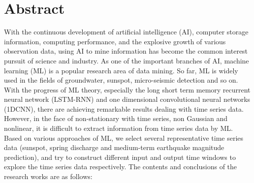 \intobmk\chapter*{Abstract}
With the continuous development of artificial intelligence (AI), computer storage information, computing performance, and the explosive growth of various observation data, using AI to mine information has become the common interest pursuit of science and industry. As one of the important branches of AI, machine learning (ML) is a popular research area of data mining. So far, ML is widely used in the fields of groundwater, sunspot, micro-seismic detection and so on. With the progress of ML theory, especially the long short term memory recurrent neural network (LSTM-RNN) and one dimensional convolutional neural networks (1DCNN), there are achieving remarkable results dealing with time series data. However, in the face of non-stationary with time series, non Gaussian and nonlinear, it is difficult to extract information from time series data by ML. Based on various approaches of ML, we select several representative time series data (sunspot, spring discharge and medium-term earthquake magnitude prediction), and try to construct different input and output time windows to explore the time series data respectively. The contents and conclusions of the research works are as follows:
